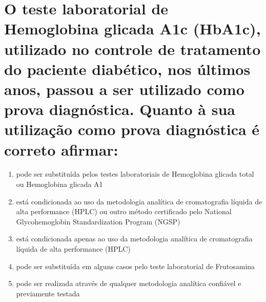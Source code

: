 \documentclass[11pt,notitlepage]{article}
\begin{document}
\section{O teste laboratorial de Hemoglobina glicada A1c (HbA1c), utilizado no controle de tratamento do paciente diabético, nos últimos anos, passou a ser utilizado como prova diagnóstica. Quanto à sua utilização como prova diagnóstica é correto afirmar: }
\begin{multicols}{2}
	\setlength{\columnseprule}{0pt}
	\begin{enumerate}[label=(\alph*)]
		\item pode ser substituída pelos testes laboratoriais de Hemoglobina glicada total ou Hemoglobina glicada A1
		\item está condicionada ao uso da metodologia analítica de cromatografia líquida de alta performance (HPLC) ou outro método certificado pelo National Glycohemoglobin Standardization Program (NGSP)
		\item está condicionada apenas ao uso da metodologia analítica de cromatografia líquida de alta performance (HPLC)
		\item pode ser substituída em alguns casos pelo teste laboratorial de Frutosamina
		\item pode ser realizada através de qualquer metodologia analítica confiável e previamente testada
	\end{enumerate}
\end{multicols}
\vspace{0.5cm}
\end{document}
